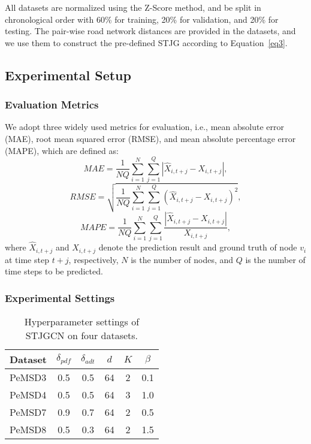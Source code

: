 \documentclass[10pt,journal,compsoc]{IEEEtran}
\begin{document}
All datasets are normalized using the Z-Score method, and be split in chronological order with 60\% for training, 20\% for validation, and 20\% for testing. The pair-wise road network distances are provided in the datasets, and we use them to construct the pre-defined STJG according to Equation~\ref{eq3}. 

\subsection{Experimental Setup} 

\subsubsection{Evaluation Metrics}

We adopt three widely used metrics for evaluation, i.e., mean absolute error (MAE), root mean squared error (RMSE), and mean absolute percentage error (MAPE), which are defined as: 
%
\begin{equation}
MAE = \frac{1}{NQ}\sum_{i=1}^{N}\sum_{j=1}^{Q}|\hat{X}_{i,t+j}-X_{i,t+j}|
\label{eq20},
\end{equation}
%
\begin{equation}
RMSE = \sqrt{\frac{1}{NQ}\sum_{i=1}^{N}\sum_{j=1}^{Q}(\hat{X}_{i,t+j}-X_{i,t+j})^2}
\label{eq21},
\end{equation}
%
\begin{equation}
MAPE = \frac{1}{NQ}\sum_{i=1}^{N}\sum_{j=1}^{Q}\frac{|\hat{X}_{i,t+j}-X_{i,t+j}|}{X_{i,t+j}}
\label{eq22},
\end{equation}
%
where $ \hat{X}_{i,t+j} $ and $ X_{i,t+j} $ denote the prediction result and ground truth of node $ v_i $ at time step $ t + j $, respectively, $ N $ is the number of nodes, and $ Q $ is the number of time steps to be predicted.

\subsubsection{Experimental Settings} 

\begin{table}
	\centering
	\caption{Hyperparameter settings of STJGCN on four datasets.}
	\begin{tabular}{lccccc}
		\toprule
		Dataset	& $ \delta_{pdf} $	& $ \delta_{adt} $ 	& $ d $	& $ K $	& $ \beta $	\\
		\midrule
		PeMSD3	& 0.5				& 0.5				& 64	& 2 	& 0.1		\\
		PeMSD4	& 0.5				& 0.5				& 64	& 3 	& 1.0		\\
		PeMSD7	& 0.9				& 0.7				& 64	& 2		& 0.5		\\
		PeMSD8	& 0.5				& 0.3				& 64	& 2		& 1.5		\\
		\bottomrule
	\end{tabular}
	\label{table3}
\end{table}
\end{document}
